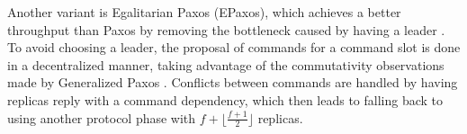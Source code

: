 Another variant is Egalitarian Paxos (EPaxos), which achieves a better throughput than Paxos by removing the bottleneck caused by having a leader \cite{Moraru2013}. To avoid choosing a leader, the proposal of commands for a command slot is done in a decentralized manner, taking advantage of the commutativity observations made by Generalized Paxos \cite{Lamport2005}. Conflicts between commands are handled by having replicas reply with a command dependency, which then leads to falling back to using another protocol phase with $f+\lfloor\frac{f+1}{2}\rfloor$ replicas.

